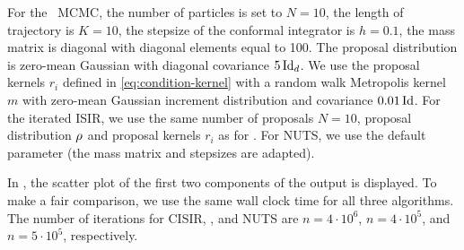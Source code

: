 \documentclass{article}
\begin{document}
For the \InFiNE\ MCMC, the number of particles is set to $N=10$, the length of trajectory is $K=10$, the stepsize of the conformal integrator is $h=0.1$, the mass matrix is diagonal with diagonal elements equal to 100. The proposal distribution is zero-mean Gaussian with diagonal covariance $5 \operatorname{Id}_d$. We use the proposal kernels $r_i$ defined in \eqref{eq:condition-kernel} with a random walk Metropolis kernel $m$ with zero-mean Gaussian increment distribution and covariance $0.01 \operatorname{Id}$.
For the iterated ISIR, we use the same number of proposals $N=10$,  proposal distribution $\rho$ and proposal kernels $r_i$ as for \IFIS.  For NUTS, we use the default parameter (the mass matrix and stepsizes are adapted).

In , the scatter plot of the first two components of the output is displayed. To make a fair comparison, we use the same wall clock time for all three algorithms. The number of iterations for CISIR, \IFIS, and NUTS are $n= 4\cdot 10^6$, $n= 4 \cdot 10^5$, and $n= 5 \cdot 10^5$, respectively.
\end{document}
